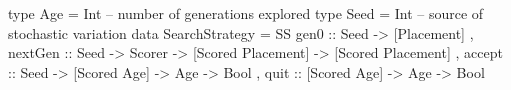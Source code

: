 type Age  = Int -- number of generations explored
type Seed = Int -- source of stochastic variation
data SearchStrategy = 
 SS { gen0    :: Seed -> [Placement]
    , nextGen :: Seed -> Scorer 
              -> [Scored Placement] -> [Scored Placement]
    , accept  :: Seed -> [Scored Age] -> Age -> Bool
    , quit    ::         [Scored Age] -> Age -> Bool
    }
